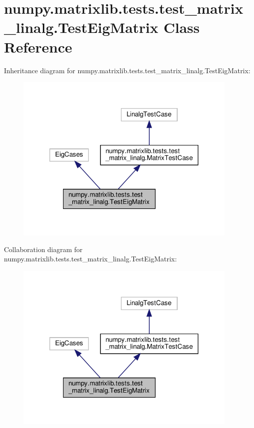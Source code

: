 \hypertarget{classnumpy_1_1matrixlib_1_1tests_1_1test__matrix__linalg_1_1TestEigMatrix}{}\section{numpy.\+matrixlib.\+tests.\+test\+\_\+matrix\+\_\+linalg.\+Test\+Eig\+Matrix Class Reference}
\label{classnumpy_1_1matrixlib_1_1tests_1_1test__matrix__linalg_1_1TestEigMatrix}


Inheritance diagram for numpy.\+matrixlib.\+tests.\+test\+\_\+matrix\+\_\+linalg.\+Test\+Eig\+Matrix\+:
\nopagebreak
\begin{figure}[H]
\begin{center}
\leavevmode
\includegraphics[width=306pt]{classnumpy_1_1matrixlib_1_1tests_1_1test__matrix__linalg_1_1TestEigMatrix__inherit__graph}
\end{center}
\end{figure}


Collaboration diagram for numpy.\+matrixlib.\+tests.\+test\+\_\+matrix\+\_\+linalg.\+Test\+Eig\+Matrix\+:
\nopagebreak
\begin{figure}[H]
\begin{center}
\leavevmode
\includegraphics[width=306pt]{classnumpy_1_1matrixlib_1_1tests_1_1test__matrix__linalg_1_1TestEigMatrix__coll__graph}
\end{center}
\end{figure}
